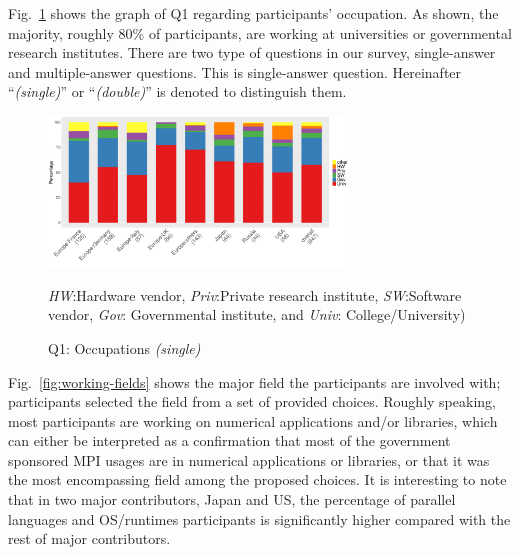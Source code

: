 \documentclass[preprint,5p,times]{elsarticle}
\def\myquote#1{{\it #1}}
\newcommand{\revision}[2]{{\color{blue}#2}}
\def\mcountries{major contributors\xspace{}}%
\begin{document}
Fig.~\ref{fig:occupations} shows the graph of Q1 regarding participants'
occupation. As shown, the majority, roughly 80\% of participants, are working at
universities or governmental research institutes. \revision{}{There
  are two type of questions in our survey, single-answer and multiple-answer
  questions. This is single-answer question. Hereinafter
  ``{\it (single)}'' or ``{\it (double)}'' is denoted to distinguish them.}
%
\begin{figure}[tb]
  \begin{center}
    \includegraphics[width=8.0cm]{R-scripts/Q1.pdf}
  \begin{center}
  \end{center}
  \vspace{-10mm}
         {\footnotesize
           \myquote{HW}:Hardware vendor,
           \myquote{Priv}:Private research institute,
           \myquote{SW}:Software vendor, \myquote{Gov}:
           Governmental institute, and \myquote{Univ}:
           College/University)
    }
    \vspace{-1.5mm}
    \caption{Q1: Occupations {\it(single)}}
    \label{fig:occupations}
\vspace{-3mm}%
  \end{center}
\end{figure}

Fig.~\ref{fig:working-fields} shows the major field the participants are
involved with; participants selected the field from a set of provided choices.
Roughly speaking, most participants are working on numerical applications and/or
libraries, which can either be interpreted as a confirmation that most of the
government sponsored MPI usages are in numerical applications or libraries, or
that it was the most encompassing field among the proposed choices.
%
It is interesting to note that in two \mcountries, Japan and US, the percentage of
parallel languages and OS/runtimes participants is significantly higher compared
with the rest of \mcountries.
\end{document}
